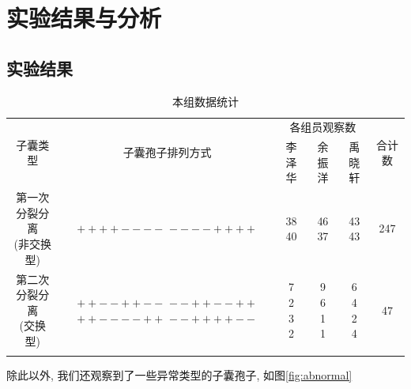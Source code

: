 \documentclass[]{LZUThesis}
\begin{document}
\chapter{实验结果与分析}
\section{实验结果}
\begin{longtable}{cccccc}
    \hline
    \multirow{2}{*}{子囊类型} & \multirow{2}{*}{子囊孢子排列方式} & \multicolumn{3}{c}{各组员观察数} & \multirow{2}{*}{合计数} \\
    \cmidrule{3-5}
    & & 李泽华 & 余振洋 & 禹晓轩 & \\
    \hline
    \thead{第一次分裂分离 \\ (非交换型)} & \thead{$+ + + + - - - -$ \\ $- - - - + + + +$} & \thead{38 \\ 40} & \thead{46 \\ 37} & \thead{43 \\ 43} & 247\\
    \hline
    \thead{第二次分裂分离 \\ (交换型)} & \thead{$+ + - - + + - -$ \\ $- - + + - - + +$ \\ $+ + - - - - + +$ \\ $- - + + + + - -$} & \thead{7 \\ 2 \\ 3 \\ 2} & \thead{9 \\ 6 \\ 1 \\ 1} & \thead{6 \\ 4 \\ 2 \\ 4} & 47\\
    \hline
    \caption{本组数据统计}
\end{longtable}

除此以外, 我们还观察到了一些异常类型的子囊孢子, 如图\ref{fig:abnormal}
\end{document}
